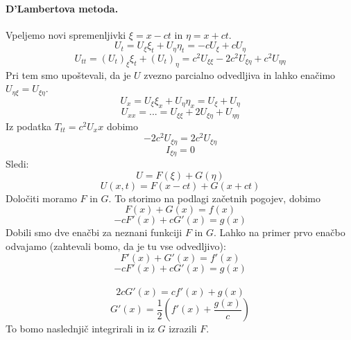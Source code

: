 \documentclass[a4paper]{article}
\begin{document}
\paragraph{D'Lambertova metoda.} Vpeljemo novi spremenljivki $\xi = x - ct$ in $\eta = x + ct$.
$$U_t = U_\xi \xi_t + U_\eta \eta_t = -cU_\xi + c U_\eta$$
$$U_{tt} = \left(U_t\right)_\xi \xi_t + \left(U_t\right)_\eta = c^2 U_{\xi\xi} - 2c^2 U_{\xi\eta} + c^2U_{\eta\eta}$$
Pri tem smo upoštevali, da je $U$ zvezno parcialno odvedljiva in lahko enačimo $U_{\eta\xi} = U_{\xi\eta}$.
$$U_x = U_\xi \xi_x + U_\eta \eta_x = U_\xi + U_\eta$$
$$U_{xx} = ... = U_{\xi\xi} + 2U_{\xi\eta} + U_{\eta\eta}$$
Iz podatka $T_{tt} = c^2U_xx$ dobimo
$$-2c^2U_{\xi\eta} = 2c^2U_{\xi\eta}$$
$$I_{\xi\eta} = 0$$
Sledi: $$U = F(\xi) + G(\eta)$$
$$U(x, t) = F(x - ct) + G(x + ct)$$
Določiti moramo $F$ in $G$. To storimo na podlagi začetnih pogojev, dobimo
$$F(x) + G(x) = f(x)$$
$$-c F'(x) + c G'(x) = g(x)$$
Dobili smo dve enačbi za neznani funkciji $F$ in $G$. Lahko na primer prvo enačbo odvajamo (zahtevali bomo, da je tu vse odvedljivo):
$$F'(x) + G'(x) = f'(x)$$
$$-cF'(x) + cG'(x) = g(x)$$
\\
$$2cG'(x) = cf'(x) + g(x)$$
$$G'(x) = \frac{1}{2}\left(f'(x) + \frac{g(x)}{c}\right)$$
To bomo naslednjič integrirali in iz $G$ izrazili $F$.
\end{document}
